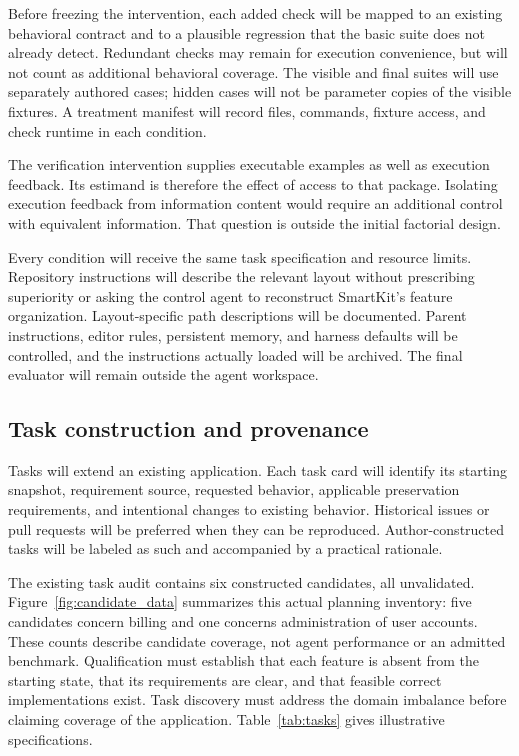 \documentclass[11pt,a4paper]{article}
\begin{document}
Before freezing the intervention, each added check will be mapped to an existing behavioral contract and to a plausible regression that the basic suite does not already detect. Redundant checks may remain for execution convenience, but will not count as additional behavioral coverage. The visible and final suites will use separately authored cases; hidden cases will not be parameter copies of the visible fixtures. A treatment manifest will record files, commands, fixture access, and check runtime in each condition.

The verification intervention supplies executable examples as well as execution feedback. Its estimand is therefore the effect of access to that package. Isolating execution feedback from information content would require an additional control with equivalent information. That question is outside the initial factorial design.

Every condition will receive the same task specification and resource limits. Repository instructions will describe the relevant layout without prescribing superiority or asking the control agent to reconstruct SmartKit's feature organization. Layout-specific path descriptions will be documented. Parent instructions, editor rules, persistent memory, and harness defaults will be controlled, and the instructions actually loaded will be archived. The final evaluator will remain outside the agent workspace.

\subsection{Task construction and provenance}
Tasks will extend an existing application. Each task card will identify its starting snapshot, requirement source, requested behavior, applicable preservation requirements, and intentional changes to existing behavior. Historical issues or pull requests will be preferred when they can be reproduced. Author-constructed tasks will be labeled as such and accompanied by a practical rationale.

The existing task audit contains six constructed candidates, all unvalidated. Figure~\ref{fig:candidate_data} summarizes this actual planning inventory: five candidates concern billing and one concerns administration of user accounts. These counts describe candidate coverage, not agent performance or an admitted benchmark. Qualification must establish that each feature is absent from the starting state, that its requirements are clear, and that feasible correct implementations exist. Task discovery must address the domain imbalance before claiming coverage of the application. Table~\ref{tab:tasks} gives illustrative specifications.
\end{document}
